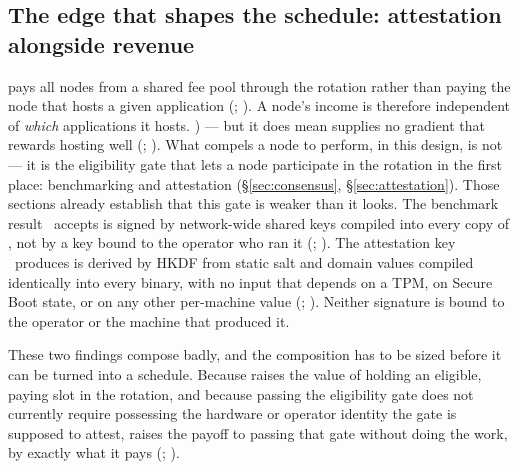 \subsection{The edge that shapes the schedule: attestation alongside revenue}\label{sec:26-precondition}

\PNR pays all nodes from a shared fee pool through the \PoN rotation rather than paying the node
that hosts a given application (\planned; ). A node's income is therefore
independent of \emph{which} applications it hosts. 
) ---
but it does mean \PNR supplies no gradient that rewards hosting well
(\planned;  ). What compels a node to perform, in this design, is not \PNR — it is the eligibility gate
that lets a node participate in the \PoN rotation in the first place: benchmarking and attestation
(\S\ref{sec:consensus}, \S\ref{sec:attestation}). Those sections already establish that this gate is
weaker than it looks. The benchmark result \fluxd\ accepts is signed by network-wide shared keys
compiled into every copy of \fluxbench, not by a key bound to the operator who ran it (\shipped;
). The attestation key \fluxsas\ produces is derived
by HKDF from static salt and domain values compiled identically into every binary, with no input
that depends on a TPM, on Secure Boot state, or on any other per-machine value (\shipped;
). Neither signature is bound to the operator or the
machine that produced it.

These two findings compose badly, and the composition has to be sized before it can be turned into a
schedule. Because \PNR raises the value of holding an eligible, paying slot in the rotation, and
because passing the eligibility gate does not currently require possessing the hardware or operator
identity the gate is supposed to attest, \PNR raises the payoff to passing that gate without doing the
work, by exactly what it pays (\planned; ).

